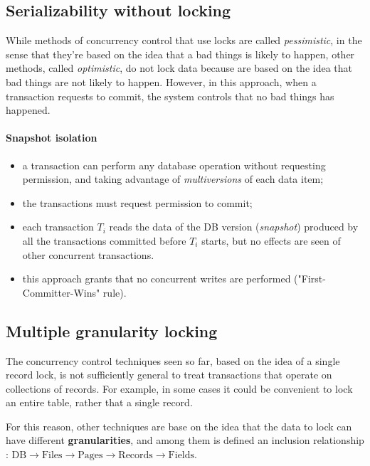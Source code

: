 \subsection{Serializability without locking}
While methods of concurrency control that use locks are called \textit{pessimistic}, in the sense that they're based on the idea that a bad things is likely to happen, other methods, called \textit{optimistic}, do not lock data because are based on the idea that bad things are not likely to happen. However, in this approach, when a transaction requests to commit, the system controls that no bad things has happened.

\paragraph{Snapshot isolation}

\begin{itemize}

    \item a transaction can perform any database operation without requesting permission, and taking advantage of \textit{multiversions} of each data item;
    
    \item the transactions must request permission to commit;

    \item each transaction $T_i$ reads the data of the DB version (\textit{snapshot}) produced by all the transactions committed before $T_i$ starts, but no effects are seen of other concurrent transactions. 

    \item this approach grants that no concurrent writes are performed ("First-Committer-Wins" rule).
    
\end{itemize}

\subsection{Multiple granularity locking}
The concurrency control techniques seen so far, based on the idea of a single record lock, is not sufficiently general to treat transactions that operate on collections of records. For example, in some cases it could be convenient to lock an entire table, rather that a single record. 

For this reason, other techniques are base on the idea that the data to lock can have different \textbf{granularities}, and among them is defined an inclusion relationship : $\text{DB} \rightarrow \text{Files} \rightarrow \text{Pages} \rightarrow \text{Records} \rightarrow \text{Fields}$.

